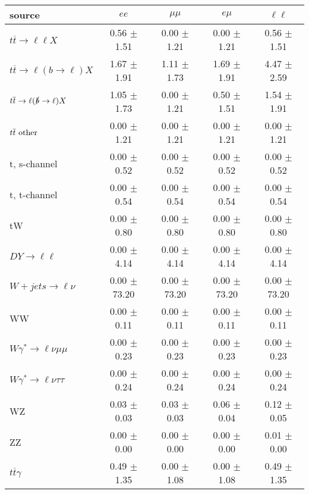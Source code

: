 \begin{tabular}{l|cccc} \hline\hline
source & $ee$ & $\mu\mu$ & $e\mu$ & $\ell\ell $ \\
\hline
$t\overline{t} \rightarrow \ell \ell X$ &  0.56 $\pm$  1.51 &  0.00 $\pm$  1.21 &  0.00 $\pm$  1.21 &  0.56 $\pm$  1.51 \\
$t\overline{t} \rightarrow \ell (b \rightarrow \ell) X$ &  1.67 $\pm$  1.91 &  1.11 $\pm$  1.73 &  1.69 $\pm$  1.91 &  4.47 $\pm$  2.59 \\
$t\overline{t} \rightarrow \ell (\slashed b \rightarrow \ell) X$ &  1.05 $\pm$  1.73 &  0.00 $\pm$  1.21 &  0.50 $\pm$  1.51 &  1.54 $\pm$  1.91 \\
        $t\overline{t}\ \rm{other}$ &  0.00 $\pm$  1.21 &  0.00 $\pm$  1.21 &  0.00 $\pm$  1.21 &  0.00 $\pm$  1.21 \\
\hline
                       t, s-channel &  0.00 $\pm$  0.52 &  0.00 $\pm$  0.52 &  0.00 $\pm$  0.52 &  0.00 $\pm$  0.52 \\
                       t, t-channel &  0.00 $\pm$  0.54 &  0.00 $\pm$  0.54 &  0.00 $\pm$  0.54 &  0.00 $\pm$  0.54 \\
                                 tW &  0.00 $\pm$  0.80 &  0.00 $\pm$  0.80 &  0.00 $\pm$  0.80 &  0.00 $\pm$  0.80 \\
\hline
         $DY \rightarrow \ell \ell$ &  0.00 $\pm$  4.14 &  0.00 $\pm$  4.14 &  0.00 $\pm$  4.14 &  0.00 $\pm$  4.14 \\
      $W+jets \rightarrow \ell \nu$ &  0.00 $\pm$ 73.20 &  0.00 $\pm$ 73.20 &  0.00 $\pm$ 73.20 &  0.00 $\pm$ 73.20 \\
                                 WW &  0.00 $\pm$  0.11 &  0.00 $\pm$  0.11 &  0.00 $\pm$  0.11 &  0.00 $\pm$  0.11 \\
\hline
$W\gamma^{*} \rightarrow \ell \nu \mu\mu$ &  0.00 $\pm$  0.23 &  0.00 $\pm$  0.23 &  0.00 $\pm$  0.23 &  0.00 $\pm$  0.23 \\
$W\gamma^{*} \rightarrow \ell \nu \tau\tau$ &  0.00 $\pm$  0.24 &  0.00 $\pm$  0.24 &  0.00 $\pm$  0.24 &  0.00 $\pm$  0.24 \\
                                 WZ &  0.03 $\pm$  0.03 &  0.03 $\pm$  0.03 &  0.06 $\pm$  0.04 &  0.12 $\pm$  0.05 \\
                                 ZZ &  0.00 $\pm$  0.00 &  0.00 $\pm$  0.00 &  0.00 $\pm$  0.00 &  0.01 $\pm$  0.00 \\
\hline
              $t\overline{t}\gamma$ &  0.49 $\pm$  1.35 &  0.00 $\pm$  1.08 &  0.00 $\pm$  1.08 &  0.49 $\pm$  1.35 \\

\end{tabular}
